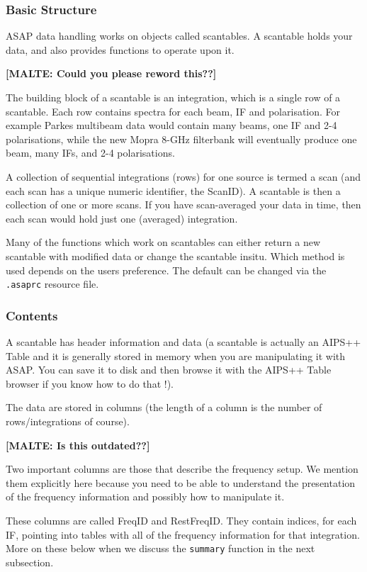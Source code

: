 \documentclass[11pt]{article}
\newcommand{\cmd}[1]{{\tt #1}}
\begin{document}
\subsubsection {Basic Structure}

ASAP data handling works on objects called
scantables.  A scantable holds your data, and also provides functions
to operate upon it.

{\bf [MALTE: Could you please reword this??]}

The building block of a scantable is an integration, which is a single
row of a scantable. Each row contains spectra for each beam, IF and
polarisation. For example Parkes multibeam data would contain many
beams, one IF and 2-4 polarisations, while the new Mopra 8-GHz
filterbank will eventually produce one beam, many IFs, and 2-4
polarisations.

A collection of sequential integrations (rows) for one source is termed
a scan (and each scan has a unique numeric identifier, the ScanID). A
scantable is then a collection  of one or more scans. If you have
scan-averaged your data in time, then each scan would  hold just one
(averaged) integration.

Many of the functions which work on scantables can either return a
new scantable with modified data or change the scantable insitu. Which
method is used depends on the users preference. The default can be
changed via the {\tt .asaprc} resource file.

\subsubsection {Contents}

A scantable has header information and data
(a scantable is actually an AIPS++ Table and it is generally stored in
memory when you are manipulating it with ASAP.  You can save it to
disk and then browse it with the AIPS++ Table browser if you know how
to do that !).

The data are stored in columns (the length of a column is the number of
rows/integrations of course).

{\bf [MALTE: Is this outdated??]}

Two important columns are those that describe the frequency setup.  We mention
them explicitly here because you need to be able to understand the presentation
of the frequency information and possibly how to manipulate it.

These columns are called FreqID and RestFreqID.  They contain indices, for
each IF, pointing into tables with all of the frequency information for that
integration.   More on these below when we discuss the \cmd{summary} function
in the next subsection.
\end{document}
